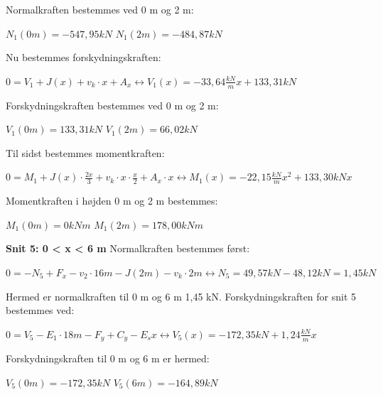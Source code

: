 Normalkraften bestemmes ved 0 m og 2 m:
\begin{center}
	$N_1(0m) = -547,\!95 kN$
	\newline
	$N_1(2m) = -484,\!87 kN$
\end{center}

Nu bestemmes forskydningskraften:
\begin{center}
	$0 = V_1 + J(x) + v_k \cdot x + A_x \leftrightarrow V_1(x) = -33,\!64\frac{kN}{m} x + 133,\!31 kN$
\end{center}

Forskydningskraften bestemmes ved 0 m og 2 m:
\begin{center}
	$V_1(0m) = 133,\!31 kN$
	\newline
	$V_1(2m) = 66,\!02 kN$
\end{center}

Til sidst bestemmes momentkraften:
\begin{center}
	$0 = M_1 + J(x) \cdot \frac{2x}{3} + v_k \cdot x \cdot \frac{x}{2} + A_x \cdot x \leftrightarrow M_1(x) = -22,\!15\frac{kN}{m} x^2 + 133,\!30kN x$
\end{center}

Momentkraften i højden 0 m og 2 m bestemmes:
\begin{center}
	$M_1(0m) = 0 kNm$
	\newline
	$M_1(2m) = 178,\!00 kNm$
\end{center}

\textbf{Snit 5: 0 < x < 6 m}
\newline
\newline
Normalkraften bestemmes først:
\begin{center}
	$0 = -N_5 + F_x - v_2 \cdot 16m - J(2m) - v_k \cdot 2m \leftrightarrow N_5 = 49,\!57 kN - 48,\!12 kN = 1,\!45 kN$
\end{center}

Hermed er normalkraften til 0 m og 6 m 1,45 kN. 
\newline
\newline
Forskydningskraften for snit 5 bestemmes ved:
\begin{center}
	$0 = V_5 - E_1 \cdot 18 m - F_y + C_y - E_s x \leftrightarrow V_5(x) = -172,\!35 kN + 1,\!24 \frac{kN}{m}x$
\end{center}

Forskydningskraften til 0 m og 6 m er hermed:
\begin{center}
	$V_5(0m) = -172,\!35 kN$
	\newline
	$V_5(6m) = -164,\!89 kN$
\end{center}

